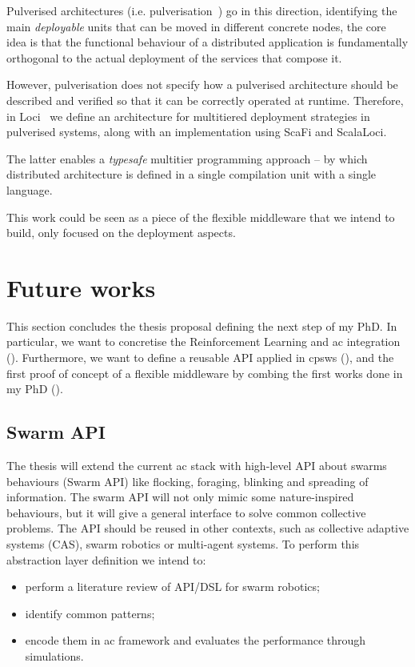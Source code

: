 \documentclass[11pt]{article}
\begin{document}
Pulverised architectures (i.e. pulverisation~\cite{DBLP:journals/fi/CasadeiPPVW20}) go in this direction, identifying the main \textit{deployable} units that can be moved in different concrete nodes, the core idea is that the functional behaviour of a distributed application is fundamentally orthogonal to the actual deployment of the services that compose it.

However, pulverisation does not specify how a pulverised architecture should
be described and verified so that it can be correctly operated at runtime.
Therefore, in \scafi{} Loci~\cite{DBLP:conf/acsos/AguzziCPSV21} we define an architecture for multitiered deployment strategies in pulverised systems, along with an implementation using ScaFi and ScalaLoci.

The latter enables a \textit{typesafe} multitier programming approach -- by which distributed architecture is defined
in a single compilation unit with a single language.

This work could be seen as a piece of the flexible middleware that we intend to build, only focused on the deployment aspects.

\section{Future works}\label{future}
This section concludes the thesis proposal defining the next step of my PhD. In particular, we want to concretise the Reinforcement Learning and \ac{ac} integration (). Furthermore, we want to define a reusable API applied in \acp{cpsw} (), and the first proof of concept of a flexible middleware by combing the first works done in my PhD (). 
\subsection{Swarm API}\label{swarm-api}
The thesis will extend the current \ac{ac} stack with high-level API about swarms behaviours (Swarm API) like flocking, foraging, blinking and spreading of information. The swarm API will not only mimic some nature-inspired behaviours, but it will give a general interface to solve common collective problems. The API should be reused in other contexts, such as collective adaptive systems (CAS), swarm robotics or multi-agent systems.
To perform this abstraction layer definition we intend to:
\begin{itemize}
	\item perform a literature review of API/DSL for swarm robotics;
	\item identify common patterns;
	\item encode them in \ac{ac} framework and evaluates the performance through simulations.
\end{itemize}
\end{document}
